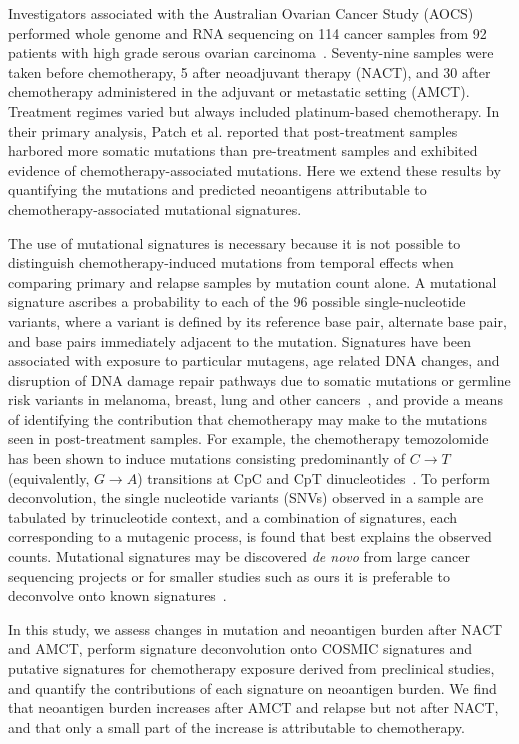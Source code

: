 Investigators associated with the Australian Ovarian Cancer Study (AOCS) performed whole genome and RNA sequencing on 114 cancer samples from 92 patients with high grade serous ovarian carcinoma~\cite{Patch_2015}. Seventy-nine samples were taken before chemotherapy, 5 after neoadjuvant therapy (NACT), and 30 after chemotherapy administered in the adjuvant or metastatic setting (AMCT). Treatment regimes varied but always included platinum-based chemotherapy. In their primary analysis, Patch et al. reported that post-treatment samples harbored more somatic mutations than pre-treatment samples and exhibited evidence of chemotherapy-associated mutations. Here we extend these results by quantifying the mutations and predicted neoantigens attributable to chemotherapy-associated mutational signatures.

The use of mutational signatures is necessary because it is not possible to distinguish chemotherapy-induced mutations from temporal effects when comparing primary and relapse samples by mutation count alone. A mutational signature ascribes a probability to each of the 96 possible single-nucleotide variants, where a variant is defined by its reference base pair, alternate base pair, and base pairs immediately adjacent to the mutation. Signatures have been associated with exposure to particular mutagens, age related DNA changes, and disruption of DNA damage repair pathways due to somatic mutations or germline risk variants in melanoma, breast, lung and other cancers~\cite{Alexandrov2013}, and provide a means of identifying the contribution that chemotherapy may make to the mutations seen in post-treatment samples. For example, the chemotherapy temozolomide has been shown to induce mutations consisting predominantly of $C \rightarrow T$ (equivalently, $G \rightarrow A$) transitions at CpC and CpT dinucleotides~\cite{Johnson_2013}. To perform deconvolution, the single nucleotide variants (SNVs) observed in a sample are tabulated by trinucleotide context, and a combination of signatures, each corresponding to a mutagenic process, is found that best explains the observed counts. Mutational signatures may be discovered \textit{de novo} from large cancer sequencing projects or  for smaller studies such as ours it is preferable to deconvolve onto known signatures~\cite{Rosenthal_2016}.

In this study, we assess changes in mutation and neoantigen burden after NACT and AMCT, perform signature deconvolution onto COSMIC signatures and putative signatures for chemotherapy exposure derived from preclinical studies, and quantify the contributions of each signature on neoantigen burden. We find that neoantigen burden increases after AMCT and relapse but not after NACT, and that only a small part of the increase is attributable to chemotherapy.


